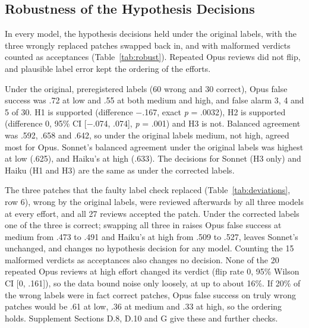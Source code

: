 \documentclass[sigconf,nonacm]{acmart}
\begin{document}
\subsection{Robustness of the Hypothesis Decisions}\label{sec:robust}

In every model, the hypothesis decisions held under the original labels, with the three wrongly replaced patches swapped back in, and with malformed verdicts counted as acceptances (Table~\ref{tab:robust}). Repeated Opus reviews did not flip, and plausible label error kept the ordering of the efforts.

Under the original, preregistered labels (60 wrong and 30 correct), Opus false success was .72 at low and .55 at both medium and high, and false alarm 3, 4 and 5 of 30. H1 is supported (difference $-$.167, exact \textit{p} = .0032), H2 is supported (difference 0, 95\% CI [$-$.074, .074], \textit{p} = .001) and H3 is not. Balanced agreement was .592, .658 and .642, so under the original labels medium, not high, agreed most for Opus. Sonnet's balanced agreement under the original labels was highest at low (.625), and Haiku's at high (.633). The decisions for Sonnet (H3 only) and Haiku (H1 and H3) are the same as under the corrected labels.

The three patches that the faulty label check replaced (Table~\ref{tab:deviations}, row 6), wrong by the original labels, were reviewed afterwards by all three models at every effort, and all 27 reviews accepted the patch. Under the corrected labels one of the three is correct; swapping all three in raises Opus false success at medium from .473 to .491 and Haiku's at high from .509 to .527, leaves Sonnet's unchanged, and changes no hypothesis decision for any model. Counting the 15 malformed verdicts as acceptances also changes no decision. None of the 20 repeated Opus reviews at high effort changed its verdict (flip rate 0, 95\% Wilson CI [0, .161]), so the data bound noise only loosely, at up to about 16\%. If 20\% of the wrong labels were in fact correct patches, Opus false success on truly wrong patches would be .61 at low, .36 at medium and .33 at high, so the ordering holds. Supplement Sections D.8, D.10 and G give these and further checks.
\end{document}

